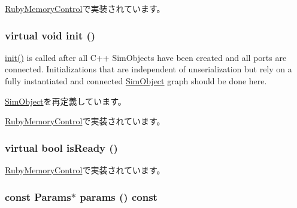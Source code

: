 \hyperlink{classRubyMemoryControl_a65314c26cf3c85d8c911524ede56456c}{RubyMemoryControl}で実装されています。\hypertarget{classMemoryControl_ab5be7e5a13ea77d59aac45d21dceb6a0}{
\subsubsection[{init}]{\setlength{\rightskip}{0pt plus 5cm}virtual void init ()}}
\label{classMemoryControl_ab5be7e5a13ea77d59aac45d21dceb6a0}
\hyperlink{classMemoryControl_ab5be7e5a13ea77d59aac45d21dceb6a0}{init()} is called after all C++ SimObjects have been created and all ports are connected. Initializations that are independent of unserialization but rely on a fully instantiated and connected \hyperlink{classSimObject}{SimObject} graph should be done here. 

\hyperlink{classSimObject_a02fd73d861ef2e4aabb38c0c9ff82947}{SimObject}を再定義しています。

\hyperlink{classRubyMemoryControl_a02fd73d861ef2e4aabb38c0c9ff82947}{RubyMemoryControl}で実装されています。\hypertarget{classMemoryControl_a90b7287ef3808f6b4b355495d24a9b38}{
\subsubsection[{isReady}]{\setlength{\rightskip}{0pt plus 5cm}virtual bool isReady ()}}
\label{classMemoryControl_a90b7287ef3808f6b4b355495d24a9b38}


\hyperlink{classRubyMemoryControl_acbed040576a7a18e2d9c46b2f15e0162}{RubyMemoryControl}で実装されています。\hypertarget{classMemoryControl_acd3c3feb78ae7a8f88fe0f110a718dff}{
\subsubsection[{params}]{\setlength{\rightskip}{0pt plus 5cm}const {\bf Params}$\ast$ params () const}}
\label{classMemoryControl_acd3c3feb78ae7a8f88fe0f110a718dff}


